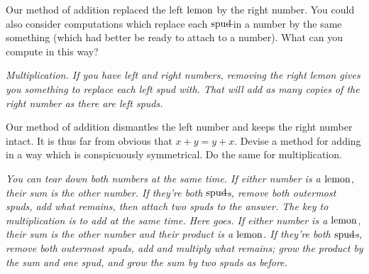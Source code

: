\documentclass{book}
\begin{document}
\begin{sol}
  Our method of addition replaced the left $\mbox{lemon}$ by the right number. You could also consider computations which replace each $\mbox{spud}\!\!\!-\!\!\!$ in a number by the same something (which had better be ready to attach to a number). What can you compute in this way?

  \emph{Multiplication. If you have left and right numbers, removing the right lemon gives you something to replace each left spud with. That will add as many copies of the right number as there are left spuds. }
\end{sol}


\begin{sol}
  Our method of addition dismantles the left number and keeps the right number intact. It is thus far from obvious that $x+y = y+x$. Devise a method for adding in a way which is conspicuously symmetrical. Do the same for multiplication.

  \emph{You can tear down both numbers at the same time. If either number is a $\mbox{lemon}$, their sum is the other number. If they're both $\mbox{spud}\!\!\!-\!\!\!\,$s, remove both outermost spuds, add what remains, then attach two spuds to the answer. The key to multiplication is to add at the same time. Here goes. If either number is a $\mbox{lemon}$, their sum is the other number and their product is a $\mbox{lemon}$. If they're both $\mbox{spud}\!\!\!-\!\!\!\,$s, remove both outermost spuds, add and multiply what remains; grow the product by the sum and one spud, and grow the sum by two spuds as before.}
\end{sol}
\end{document}
